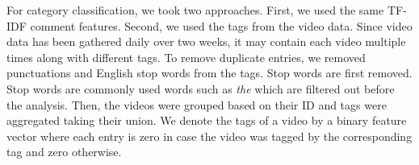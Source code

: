 For category classification, we took two approaches. First, we used the same TF-IDF comment features. Second, we used the tags from the video data. Since video data has been gathered daily over two weeks, it may contain each video multiple times along with different tags. To remove duplicate entries, we removed punctuations and English stop words from the tags. Stop words are first removed. Stop words are commonly used words such as \textit{the} which are filtered out before the analysis. Then, the videos were grouped based on their ID and tags were aggregated taking their union. We denote the tags of a video by a binary feature vector where each entry is zero in case the video was tagged by the corresponding tag and zero otherwise.